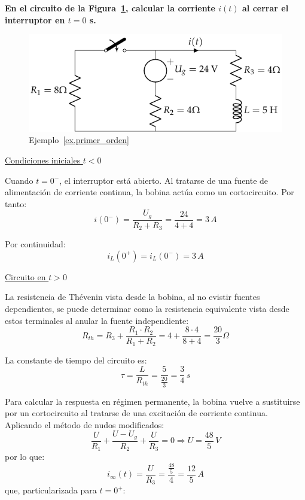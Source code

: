 \begin{example}\label{ex.primer_orden}
  \textbf{En el circuito de la Figura~\ref{fig:ej_transitorio_1orden},
    calcular la corriente $i(t)$ al cerrar el interruptor en $t = 0$
    s.}
  \begin{figure}[H]
    \centering \includegraphics{../figs/ej_transitorio_1orden.pdf}
    \caption{Ejemplo~\ref{ex.primer_orden}}
    \label{fig:ej_transitorio_1orden}
  \end{figure}
	    
  \underline{Condiciones iniciales $t<0$}
	    
  Cuando $t=0^-$, el interruptor está abierto. Al tratarse de una
  fuente de alimentación de corriente continua, la bobina actúa como
  un cortocircuito. Por tanto:
  \begin{equation*}
    i(0^-)=\dfrac{U_g}{R_2+R_3}=\dfrac{24}{4+4}=3\,A
  \end{equation*}
	    
  Por continuidad:
  \begin{equation*}
    i_L(0^+)=i_L(0^-)=3\,A
  \end{equation*}
	    
  \underline{Circuito en $t>0$}
	    
  La resistencia de Thévenin vista desde la bobina, al no evistir
  fuentes dependientes, se puede determinar como la resistencia
  equivalente vista desde estos terminales al anular la fuente
  independiente:
  \begin{equation*}
    R_{th}=R_3+\dfrac{R_1\cdot R_2}{R_1+R_2}=4+\dfrac{8\cdot 4}{8+4}=\dfrac{20}{3}\Omega
  \end{equation*}
	    
  La constante de tiempo del circuito es:
  \begin{equation*}
    \tau=\dfrac{L}{R_{th}}=\dfrac{5}{\frac{20}{3}}=\dfrac{3}{4} \,s
  \end{equation*}
	    
  Para calcular la respuesta en régimen permanente, la bobina vuelve a
  sustituirse por un cortocircuito al tratarse de una excitación de
  corriente continua. Aplicando el método de nudos modificados:
  \begin{equation*}
    \dfrac{U}{R_1}+\dfrac{U-U_g}{R_2}+\dfrac{U}{R_3}=0\Rightarrow U=\dfrac{48}{5}\,V
  \end{equation*}
  por lo que:
  \begin{equation*}
    i_\infty(t)=\dfrac{U}{R_3}=\dfrac{\frac{48}{5}}{4}=\dfrac{12}{5}\,A
  \end{equation*}
  que, particularizada para $t=0^+$:
	    

\end{example}
